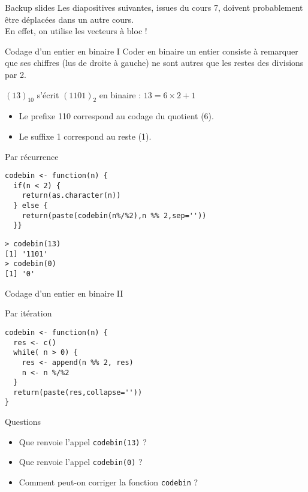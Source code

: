 \documentclass[10pt]{beamer}
\begin{document}
\begin{frame}[fragile]{Backup slides}
  Les diapositives suivantes, issues du cours 7, doivent probablement être déplacées dans un autre cours. \\
  En effet, on utilise les vecteurs à bloc ! 
\end{frame}
 

\begin{frame}[fragile]{Codage d'un entier en binaire I}
  Coder en binaire un entier consiste à remarquer que ses chiffres (lus de droite à gauche) ne sont autres que les restes des divisions par 2.
  \begin{exampleblock}{$(13)_{10}$ s'écrit $(1101)_2$ en binaire : $13 = 6 \times 2 + 1$}
    \begin{itemize}
    \item Le prefixe 110 correspond au codage du quotient (6).
    \item Le suffixe 1 correspond au reste (1).
    \end{itemize}
  \end{exampleblock}

  \begin{block}{Par récurrence}
    \begin{lstlisting}[style=edblock]
codebin <- function(n) {
  if(n < 2) {
    return(as.character(n))
  } else {
    return(paste(codebin(n%/%2),n %% 2,sep=''))
  }}      
    \end{lstlisting}
  \end{block}

  \begin{lstlisting}
> codebin(13)
[1] '1101'
> codebin(0)
[1] '0'
\end{lstlisting}


\end{frame}


\begin{frame}[fragile]{Codage d'un entier en binaire II}
  \begin{block}{Par itération}
    \begin{lstlisting}[style=edblock]
codebin <- function(n) {
  res <- c()
  while( n > 0) {
    res <- append(n %% 2, res)
    n <- n %/%2
  }
  return(paste(res,collapse=''))
}      
    \end{lstlisting}
  \end{block}

  \begin{exampleblock}{Questions}
    \begin{itemize}
    \item Que renvoie l'appel \texttt{codebin(13)} ?
    \item Que renvoie l'appel \texttt{codebin(0)} ?
    \item Comment peut-on corriger la fonction \texttt{codebin} ?
    \end{itemize}
  \end{exampleblock}

\end{frame}
\end{document}
